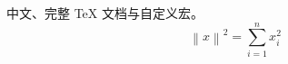 \documentclass{article}
\newcommand{\norm}[1]{\left\lVert #1\right\rVert}
\begin{document}
中文、完整 TeX 文档与自定义宏。
\[\norm{x}^2=\sum_{i=1}^{n}x_i^2\]
\end{document}

